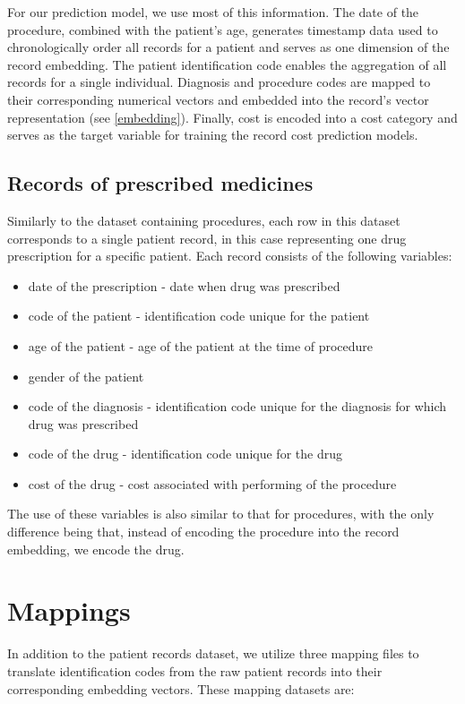 For our prediction model, we use most of this information. The date of the procedure, combined with the patient’s age, generates timestamp data used to chronologically order all records for a patient and serves as one dimension of the record embedding. The patient identification code enables the aggregation of all records for a single individual. Diagnosis and procedure codes are mapped to their corresponding numerical vectors and embedded into the record’s vector representation (see \ref{embedding}). Finally, cost is encoded into a cost category and serves as the target variable for training the record cost prediction models.

\subsection{Records of prescribed medicines}

Similarly to the dataset containing procedures, each row in this dataset corresponds to a single patient record, in this case representing one drug prescription for a specific patient. Each record consists of the following variables:

\begin{itemize}
	\item date of the prescription - date when drug was prescribed
	\item code of the patient - identification code unique for the patient
	\item age of the patient - age of the patient at the time of procedure
	\item gender of the patient
	\item code of the diagnosis - identification code unique for the diagnosis for which drug was prescribed
	\item code of the drug - identification code unique for the drug 
	\item cost of the drug - cost associated with performing of the procedure
\end{itemize}

The use of these variables is also similar to that for procedures, with the only difference being that, instead of encoding the procedure into the record embedding, we encode the drug.

\section{Mappings}

In addition to the patient records dataset, we utilize three mapping files to translate identification codes from the raw patient records into their corresponding embedding vectors. These mapping datasets are:

